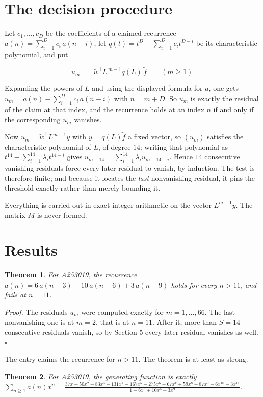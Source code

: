 \documentclass[11pt]{article}
\newtheorem{theorem}{Theorem}
\theoremstyle{definition}
\begin{document}
\section{The decision procedure}

Let $c_1,\dots,c_D$ be the coefficients of a claimed recurrence $a(n) = \sum_{i=1}^{D} c_i\,a(n-i)$, let $q(t) = t^{D} - \sum_{i=1}^{D} c_i t^{D-i}$ be its characteristic polynomial, and put

\[u_m \;=\; \tilde w^{\mathsf T} L^{\,m-1} q(L)\,\tilde f \qquad (m \ge 1).\]

Expanding the powers of $L$ and using the displayed formula for $a$, one gets $u_m = a(n) - \sum_{i=1}^{D} c_i\,a(n-i)$ with $n = m + D$. So $u_m$ is exactly the residual of the claim at that index, and the recurrence holds at an index $n$ if and only if the corresponding $u_m$ vanishes.

Now $u_m = \tilde w^{\mathsf T} L^{m-1} y$ with $y = q(L)\tilde f$ a fixed vector, so $(u_m)$ satisfies the characteristic polynomial of $L$, of degree $14$: writing that polynomial as $t^{14} - \sum_{i=1}^{14} \lambda_i t^{14-i}$ gives $u_{m+14} = \sum_{i=1}^{14} \lambda_i u_{m+14-i}$. Hence $14$ consecutive vanishing residuals force every later residual to vanish, by induction. The test is therefore finite; and because it locates the {\itshape last} nonvanishing residual, it pins the threshold exactly rather than merely bounding it.

Everything is carried out in exact integer arithmetic on the vector $L^{m-1}y$. The matrix $M$ is never formed.

\section{Results}

\begin{theorem} For A253019, the recurrence $a(n) = 6\,a(n-3) - 10\,a(n-6) + 3\,a(n-9)$ holds for every $n > 11$, and fails at $n = 11$.\end{theorem}

{\itshape Proof.} The residuals $u_m$ were computed exactly for $m = 1,\dots,66$. The last nonvanishing one is at $m = 2$, that is at $n = 11$. After it, more than $S = 14$ consecutive residuals vanish, so by Section 5 every later residual vanishes as well. $\square$

The entry claims the recurrence for $n > 11$. The theorem is at least as strong.

\begin{theorem} For A253019, the generating function is exactly $\sum_{n\ge 1} a(n)x^n = \frac{37x + 50x^{2} + 83x^{3} - 131x^{4} - 167x^{5} - 275x^{6} + 67x^{7} + 59x^{8} + 87x^{9} - 6x^{10} - 3x^{11}}{1 - 6x^{3} + 10x^{6} - 3x^{9}}$.\end{theorem}
\end{document}

